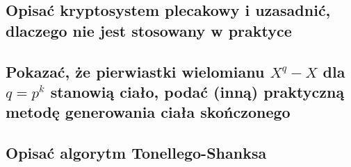 \subsection{Opisać kryptosystem plecakowy i uzasadnić, dlaczego nie jest stosowany w praktyce}



\subsection{Pokazać, że pierwiastki wielomianu $X^q - X$ dla $q = p^k$ stanowią ciało, podać (inną) praktyczną metodę generowania ciała skończonego}



\subsection{Opisać algorytm Tonellego-Shanksa}

